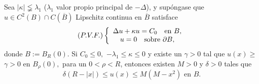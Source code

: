 

\begin{theorem}
Sea $\left|  \kappa\right|  \lneqq\lambda_{1}$ ($\lambda_{1}$ valor propio
principal de $-\Delta$), y sup\'{o}ngase que \linebreak $u\in C^{2}\left(
B\right)  \cap C(\overline{B})$ Lipschitz continua en $\overline{B}$
satisface
\[
\left(  P.V.F.\right)  \left\{
\begin{array}
[c]{c}%
\Delta u+\kappa u=C_{0}\text{ \ \ en }B,\\
u=0\text{ \ \ sobre }\partial B,
\end{array}
\right.
\]
donde $B:=B_{R}\left(  0\right)  .$ Si $C_{0}\leq0,$ $-\lambda_{1}\leq
\kappa\leq0$ y existe un $\gamma>0$ tal que $u(x)\geq$ $\gamma>0$ en $B_{\rho
}\left(  0\right)  ,$ para un $0<\rho<R$, entonces existen $M>0$ y $\delta>0$
tales que
\[
\delta\left(  R-\left|  x\right|  \right)  \leq u\left(  x\right)  \leq
M\left(  M-x^{2}\right)  \text{ \ \ en }B\text{.}%
\]
\end{theorem}
